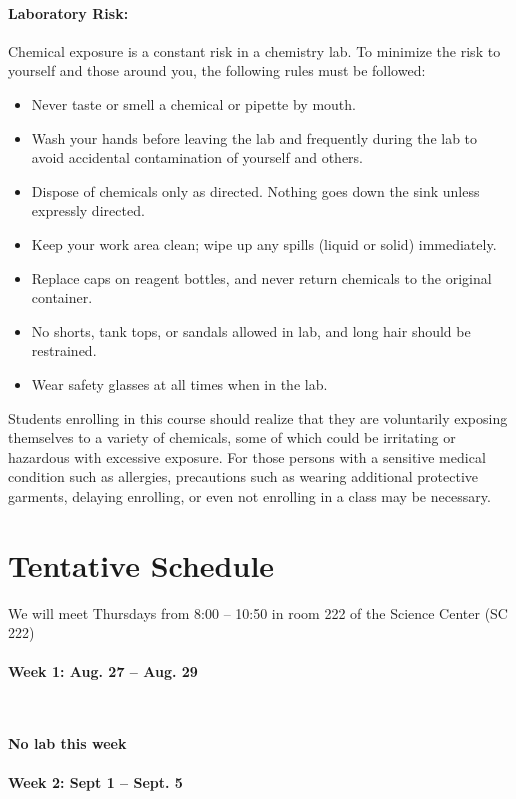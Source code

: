 \documentclass[12pt, letterpaper]{article}
\begin{document}
\paragraph{Laboratory Risk:}
Chemical exposure is a constant risk in a chemistry lab. To minimize the risk to yourself and those around you, the following rules must be followed:
\begin{itemize}
	\item Never taste or smell a chemical or pipette by mouth.
	\item Wash your hands before leaving the lab and frequently during the lab to avoid accidental contamination of yourself and others.
	\item Dispose of chemicals only as directed. Nothing goes down the sink unless expressly directed.
	\item Keep your work area clean; wipe up any spills (liquid or solid) immediately.
	\item Replace caps on reagent bottles, and never return chemicals to the original container.
	\item No shorts, tank tops, or sandals allowed in lab, and long hair should be restrained.
	\item Wear safety glasses at all times when in the lab.
\end{itemize}
Students enrolling in this course should realize that they are voluntarily exposing themselves to a variety of chemicals, some of which could be irritating or hazardous with excessive exposure.  For those persons with a sensitive medical condition such as allergies, precautions such as wearing additional protective garments, delaying enrolling, or even not enrolling in a class may be necessary.

\section*{Tentative Schedule}
We will meet Thursdays from 8:00 -- 10:50 in room 222 of the Science Center (SC 222) 

\paragraph*{Week 1: Aug. 27 -- Aug. 29}~

\textbf{No lab this week}

\paragraph{Week 2: Sept 1 -- Sept. 5}~
\end{document}
